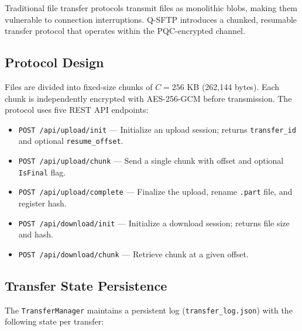 Traditional file transfer protocols transmit files as monolithic blobs, making them vulnerable to connection interruptions. Q-SFTP introduces a chunked, resumable transfer protocol that operates within the PQC-encrypted channel.

\subsection{Protocol Design}

Files are divided into fixed-size chunks of $C = 256$ KB (262,144 bytes). Each chunk is independently encrypted with AES-256-GCM before transmission. The protocol uses five REST API endpoints:

\begin{itemize}
    \item \texttt{POST /api/upload/init} — Initialize an upload session; returns \texttt{transfer\_id} and optional \texttt{resume\_offset}.
    \item \texttt{POST /api/upload/chunk} — Send a single chunk with offset and optional \texttt{IsFinal} flag.
    \item \texttt{POST /api/upload/complete} — Finalize the upload, rename \texttt{.part} file, and register hash.
    \item \texttt{POST /api/download/init} — Initialize a download session; returns file size and hash.
    \item \texttt{POST /api/download/chunk} — Retrieve chunk at a given offset.
\end{itemize}

\subsection{Transfer State Persistence}

The \texttt{TransferManager} maintains a persistent log (\texttt{transfer\_log.json}) with the following state per transfer:

